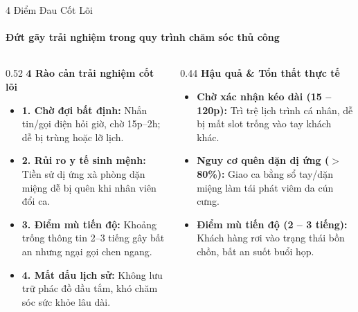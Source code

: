 \begin{frame}{4 Điểm Đau Cốt Lõi}
  \framesubtitle{\color{white!90}\textbf{Đứt gãy trải nghiệm trong quy trình chăm sóc thủ công}}

  \begin{columns}[T]
    \begin{column}{0.52\textwidth}
      {\color{PetcarePrimary}\large \textbf{4 Rào cản trải nghiệm cốt lõi}}\\[2mm]
      \small
      \begin{itemize}
        \setlength\itemsep{2.8mm}
        \item \textbf{1. Chờ đợi bất định:} Nhắn tin/gọi điện hỏi giờ, chờ 15p--2h; dễ bị trùng hoặc lỡ lịch.
        \item \textbf{2. Rủi ro y tế sinh mệnh:} Tiền sử dị ứng xà phòng dặn miệng dễ bị quên khi nhân viên đổi ca.
        \item \textbf{3. Điểm mù tiến độ:} Khoảng trống thông tin 2--3 tiếng gây bất an nhưng ngại gọi chen ngang.
        \item \textbf{4. Mất dấu lịch sử:} Không lưu trữ phác đồ dầu tắm, khó chăm sóc sức khỏe lâu dài.
      \end{itemize}
    \end{column}

    \begin{column}{0.44\textwidth}
      {\color{PetcarePrimary}\large \textbf{Hậu quả \& Tổn thất thực tế}}\\[2mm]
      \small
      \begin{itemize}
        \setlength\itemsep{3mm}
        \item \textbf{Chờ xác nhận kéo dài (15 -- 120p):} Trì trệ lịch trình cá nhân, dễ bị mất slot trống vào tay khách khác.
        \item \textbf{Nguy cơ quên dặn dị ứng ($>$ 80\%):} Giao ca bằng sổ tay/dặn miệng làm tái phát viêm da cún cưng.
        \item \textbf{Điểm mù tiến độ (2 -- 3 tiếng):} Khách hàng rơi vào trạng thái bồn chồn, bất an suốt buổi họp.
      \end{itemize}
    \end{column}
  \end{columns}
\end{frame}
